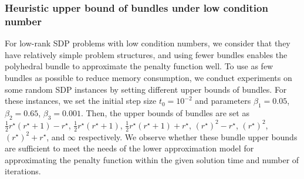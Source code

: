 \documentclass{jcmlatex}
\begin{document}
\subsubsection{Heuristic upper bound of bundles under low condition number}
For low-rank SDP problems with low condition numbers, we consider that they have relatively simple problem structures, and using fewer bundles enables the polyhedral bundle to approximate the penalty function well. To use as few bundles as possible to reduce memory consumption, we conduct experiments on some random SDP instances by setting different upper bounds of bundles. For these instances, we set the initial step size \(t_0 = 10^{-2}\) and parameters \(\beta_1 = 0.05\), \(\beta_2 = 0.65\), \(\beta_3 = 0.001\). Then, the upper bounds of bundles are set as \(\frac{1}{2}r^{\star}(r^{\star}+1)-r^{\star}\), \(\frac{1}{2}r^{\star}(r^{\star}+1)\), \(\frac{1}{2}r^{\star}(r^{\star}+1)+r^{\star}\), \((r^{\star})^2-r^{\star}\), \((r^{\star})^2\), \((r^{\star})^2+r^{\star}\), and \(\infty\) respectively. We observe whether these bundle upper bounds are sufficient to meet the needs of the lower approximation model for approximating the penalty function within the given solution time and number of iterations.
\end{document}

